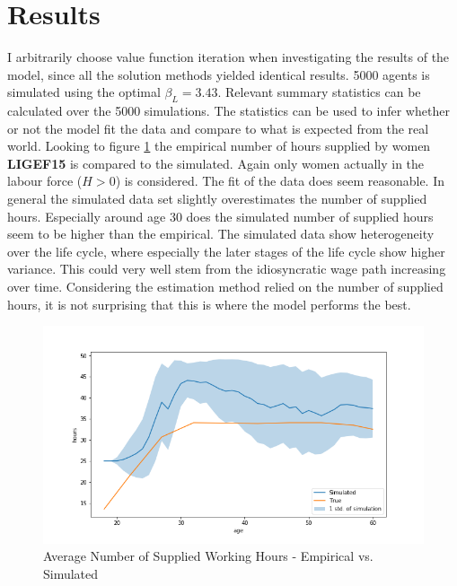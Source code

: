 \section{Results}

I arbitrarily choose value function iteration when investigating the results of the model, since all the solution methods yielded identical results. 5000 agents is simulated using the optimal $\beta_L = 3.43$. Relevant summary statistics can be calculated over the 5000 simulations. The statistics can be used to infer whether or not the model fit the data and compare to what is expected from the real world. Looking to figure \ref{fig:dqi_model1_average_path_sim_vs_empirical} the empirical number of hours supplied by women \textbf{LIGEF15} is compared to the simulated. Again only women actually in the labour force  ($H>0$) is considered. The fit of the data does seem reasonable. In general the simulated data set slightly overestimates the number of supplied hours. Especially around age 30 does the simulated number of supplied hours seem to be higher than the empirical. The simulated data show heterogeneity over the life cycle, where especially the later stages of the life cycle show higher variance. This could very well stem from the idiosyncratic wage path increasing over time. Considering the estimation method relied on the number of supplied hours, it is not surprising that this is where the model performs the best. 


\begin{figure}
    \centering
    \includegraphics[scale=0.4]{figures/dqi_model1_estimation_labour_supply.png}
    \caption{Average Number of Supplied Working Hours - Empirical vs. Simulated}
    \label{fig:dqi_model1_average_path_sim_vs_empirical}
\end{figure}

